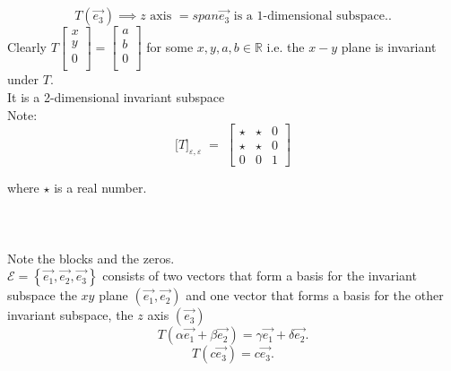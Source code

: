 \documentclass{report}
\begin{document}
{\begin{tikzpicture}[scale=1.2,>=Latex,line join=round]
\end{tikzpicture}
      \\
      \\
      \[
	      T \left(  \vec{ e_3}  \right)  \implies z \text{ axis } = span { \vec{ e_3 } }  \text{ is a 1-dimensional subspace.}
      .\] 
      Clearly $ T \begin{bmatrix}
      x\\
      y\\
      0\\
      \end{bmatrix}
      = \begin{bmatrix}
      a\\
      b\\
      0\\
      \end{bmatrix}
      $ for some $ x , y , a , b \in \mathbb{R}$ i.e.  the $ x-y$ plane is invariant under $ T$.\\
      It is a 2-dimensional invariant subspace\\
      Note:\\
     \[
\bigl[T\bigr]_{\varepsilon , \varepsilon} \;=\;
\left[
\begin{array}{cc|c}
 \star & \star & 0 \\[4pt]
 \star & \star & 0 \\[4pt]
 0 & 0 & 1
\end{array}
\right]
\]



        where $ \star$ is a real number.\\
	\\
	\\
	\\
           Note the blocks and the zeros.\\
	   $ \mathcal{E}= \left\{ \vec{ e_1}, \vec{ e_2} , \vec{ e_3}   \right\}  $  consists of two vectors that form a basis for the invariant subspace the $ xy$ plane $ \left(  \vec{ e_1} ,\vec{ e_2}  \right) $ and one vector that forms a basis for the other invariant subspace, the $ z$ axis $ \left( \vec{ e_3}  \right) $ 
	   \[
	            T \left( \alpha \vec{ e_1} + \beta \vec{ e_2}  \right)  = \gamma \vec{ e_1} + \delta \vec{ e_2} 
	   .\] 
	   \[
	   T \left( c \vec{ e_3}  \right) = c \vec{ e_3} 
	   .\] 
      }
      
\end{document}
